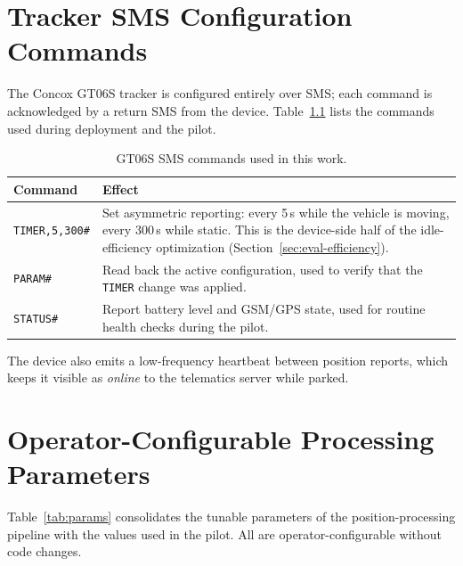 
\chapter{Tracker SMS Configuration Commands}
\label{app:sms}
The Concox GT06S tracker is configured entirely over SMS; each command
is acknowledged by a return SMS from the device. Table~\ref{tab:sms}
lists the commands used during deployment and the pilot.

\begin{table}[H]
\caption{GT06S SMS commands used in this work.}
\label{tab:sms}
\centering
\small
\begin{tabular}{@{}lp{9.6cm}@{}}
\toprule
\textbf{Command} & \textbf{Effect} \\
\midrule
\texttt{TIMER,5,300\#} & Set asymmetric reporting: every 5\,s while the
vehicle is moving, every 300\,s while static. This is the device-side
half of the idle-efficiency optimization
(Section~\ref{sec:eval-efficiency}). \\
\texttt{PARAM\#} & Read back the active configuration, used to verify
that the \texttt{TIMER} change was applied. \\
\texttt{STATUS\#} & Report battery level and GSM/GPS state, used for
routine health checks during the pilot. \\
\bottomrule
\end{tabular}
\end{table}

The device also emits a low-frequency heartbeat between position
reports, which keeps it visible as \emph{online} to the telematics
server while parked.

\chapter{Operator-Configurable Processing Parameters}
\label{app:params}
Table~\ref{tab:params} consolidates the tunable parameters of the
position-processing pipeline with the values used in the pilot. All are
operator-configurable without code changes.

